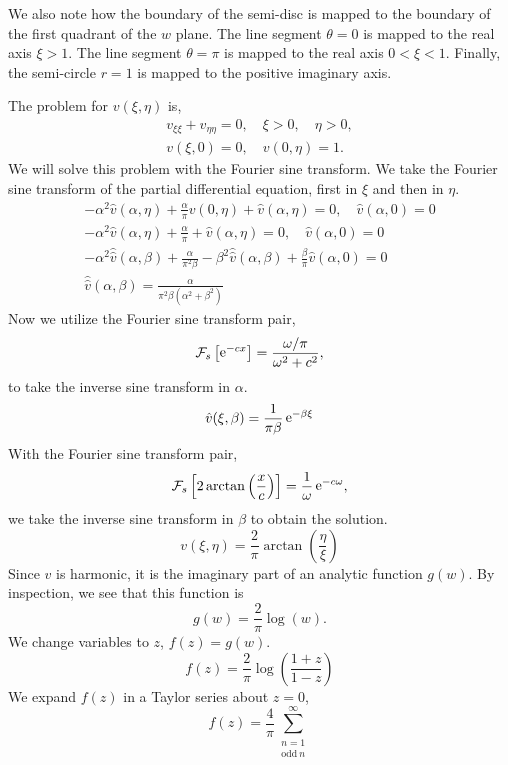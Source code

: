 {\begin{Solution}
  We also note how the boundary of the semi-disc is mapped to the 
  boundary of the first quadrant of the $w$ plane.  The line segment
  $\theta = 0$ is mapped to the real axis $\xi > 1$.  The line segment
  $\theta = \pi$ is mapped to the real axis $0 < \xi < 1$.  Finally,
  the semi-circle $r = 1$ is mapped to the positive imaginary axis.

  The problem for $v(\xi,\eta)$ is,
  \begin{gather*}
    v_{\xi\xi} + v_{\eta\eta} = 0, \quad \xi > 0, \quad \eta > 0, \\
    v(\xi,0) = 0, \quad v(0,\eta) = 1.
  \end{gather*}
  We will solve this problem with the Fourier sine transform.  We take the
  Fourier sine transform of the partial differential equation, first
  in $\xi$ and then in $\eta$.
  \begin{gather*}
    -\alpha^2 \hat{v}(\alpha, \eta) + \frac{\alpha}{\pi} v(0, \eta) 
    + \hat{v}(\alpha,\eta) = 0, \quad \hat{v}(\alpha, 0) = 0 \\
    -\alpha^2 \hat{v}(\alpha, \eta) + \frac{\alpha}{\pi} 
    + \hat{v}(\alpha,\eta) = 0, \quad \hat{v}(\alpha, 0) = 0 \\
    -\alpha^2 \hat{\hat{v}}(\alpha, \beta) + \frac{\alpha}{\pi^2 \beta} 
    - \beta^2 \hat{\hat{v}}(\alpha,\beta) 
    + \frac{\beta}{\pi} \hat{v}(\alpha, 0) = 0 \\
    \hat{\hat{v}}(\alpha, \beta) = \frac{\alpha}{\pi^2 \beta (\alpha^2 + \beta^2)}
  \end{gather*}
  Now we utilize the Fourier sine transform pair,
  \[
  \mathcal{F}_s \left[ \mathop{\mathrm{e}}\nolimits^{-c x} \right] = \frac{\omega / \pi}{ \omega^2 + c^2},
  \]
  to take the inverse sine transform in $\alpha$.
  \[
  \hat{v}(\xi,\beta) = \frac{1}{\pi \beta} \mathop{\mathrm{e}}\nolimits^{- \beta \xi}
  \]
  With the Fourier sine transform pair,
  \[
  \mathcal{F}_s \left[ 2 \arctan \left( \frac{x}{c} \right) \right] = 
  \frac{1}{\omega} \mathop{\mathrm{e}}\nolimits^{-c \omega},
  \]
  we take the inverse sine transform in $\beta$ to obtain the solution.
  \[
  \boxed{
    v(\xi,\eta) = \frac{2}{\pi} \arctan \left( \frac{\eta}{\xi} \right)
    }
  \]
  Since $v$ is harmonic, it is the imaginary part of an analytic function
  $g(w)$.  By inspection, we see that this function is
  \[
  g(w) = \frac{2}{\pi} \log(w).
  \]
  We change variables to $z$, $f(z) = g(w)$.
  \[
  f(z) = \frac{2}{\pi} \log \left( \frac{1+z}{1-z} \right)
  \]
  We expand $f(z)$ in a Taylor series about $z = 0$,
  \[
  f(z) = \frac{4}{\pi} \sum_{\substack{n = 1 \\ \mathrm{odd}\ n}}^\infty
\]
\end{Solution}}
